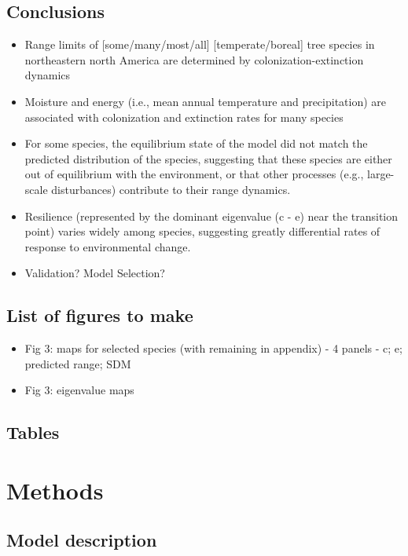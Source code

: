 \documentclass[11pt]{article}
\begin{document}
\subsection*{Conclusions}
\begin{itemize}
	\item Range limits of [some/many/most/all] [temperate/boreal] tree species in northeastern north America are determined by colonization-extinction dynamics
	\item Moisture and energy (i.e., mean annual temperature and precipitation) are associated with colonization and extinction rates for many species
	\item For some species, the equilibrium state of the model did not match the predicted distribution of the species, suggesting that these species are either out of equilibrium with the environment, or that other processes (e.g., large-scale disturbances) contribute to their range dynamics.
	\item Resilience (represented by the dominant eigenvalue (c - e) near the transition point) varies widely among species, suggesting greatly differential rates of response to environmental change.
	\item Validation? Model Selection?
\end{itemize}


\subsection*{List of figures to make}
\begin{itemize}
	\item Fig 3: maps for selected species (with remaining in appendix) - 4 panels - c; e; predicted range; SDM
	\item Fig 3: eigenvalue maps
\end{itemize}

\subsection*{Tables}



\section*{Methods}

\subsection*{Model description}
\end{document}
